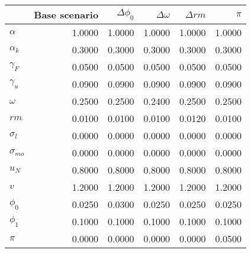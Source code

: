 \begin{tabular}{lrrrrr}
\toprule
{} &  Base scenario &  $\Delta \phi_0$ &  $\Delta \omega$ &  $\Delta rm$ &  $\pi$ \\
\midrule
$\alpha$      &         1.0000 &           1.0000 &           1.0000 &       1.0000 & 1.0000 \\
$\alpha_{k}$  &         0.3000 &           0.3000 &           0.3000 &       0.3000 & 0.3000 \\
$\gamma_F$    &         0.0500 &           0.0500 &           0.0500 &       0.0500 & 0.0500 \\
$\gamma_u$    &         0.0900 &           0.0900 &           0.0900 &       0.0900 & 0.0900 \\
$\omega$      &         0.2500 &           0.2500 &           0.2400 &       0.2500 & 0.2500 \\
$rm$          &         0.0100 &           0.0100 &           0.0100 &       0.0120 & 0.0100 \\
$\sigma_{l}$  &         0.0000 &           0.0000 &           0.0000 &       0.0000 & 0.0000 \\
$\sigma_{mo}$ &         0.0000 &           0.0000 &           0.0000 &       0.0000 & 0.0000 \\
$u_N$         &         0.8000 &           0.8000 &           0.8000 &       0.8000 & 0.8000 \\
$v$           &         1.2000 &           1.2000 &           1.2000 &       1.2000 & 1.2000 \\
$\phi_0$      &         0.0250 &           0.0300 &           0.0250 &       0.0250 & 0.0250 \\
$\phi_1$      &         0.1000 &           0.1000 &           0.1000 &       0.1000 & 0.1000 \\
$\pi$         &         0.0000 &           0.0000 &           0.0000 &       0.0000 & 0.0500 \\
\bottomrule
\end{tabular}
